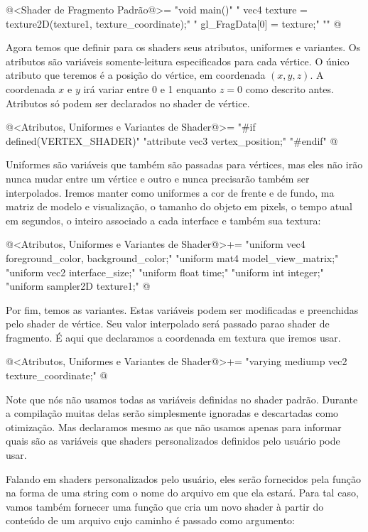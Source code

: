 \iniciocodigo
@<Shader de Fragmento Padrão@>=
"void main(){\n"
"  vec4 texture = texture2D(texture1, texture_coordinate);\n"
"  gl_FragData[0] = texture;\n"
"}\n"
@
\fimcodigo

Agora temos que definir para os shaders seus atributos, uniformes e
variantes. Os atributos são variáveis somente-leitura especificados
para cada vértice. O único atributo que teremos é a posição do
vértice, em coordenada $(x, y, z)$. A coordenada $x$ e $y$ irá variar
entre 0 e 1 enquanto $z=0$ como descrito antes. Atributos só podem ser
declarados no shader de vértice.

\iniciocodigo
@<Atributos, Uniformes e Variantes de Shader@>=
"#if defined(VERTEX_SHADER)\n"
"attribute vec3 vertex_position;\n"
"#endif\n"
@
\fimcodigo

Uniformes são variáveis que também são passadas para vértices, mas
eles não irão nunca mudar entre um vértice e outro e nunca precisarão
também ser interpolados. Iremos manter como uniformes a cor de frente
e de fundo, ma matriz de modelo e visualização, o tamanho do objeto em
pixels, o tempo atual em segundos, o inteiro associado a cada
interface e também sua textura:

\iniciocodigo
@<Atributos, Uniformes e Variantes de Shader@>+=
"uniform vec4 foreground_color, background_color;\n"
"uniform mat4 model_view_matrix;\n"
"uniform vec2 interface_size;\n"
"uniform float time;\n"
"uniform int integer;\n"
"uniform sampler2D texture1;\n"
@
\fimcodigo

Por fim, temos as variantes. Estas variáveis podem ser modificadas e
preenchidas pelo shader de vértice. Seu valor interpolado será passado
parao shader de fragmento. É aqui que declaramos a coordenada em
textura que iremos usar.

\iniciocodigo
@<Atributos, Uniformes e Variantes de Shader@>+=
"varying mediump vec2 texture_coordinate;\n"
@
\fimcodigo

Note que nós não usamos todas as variáveis definidas no shader
padrão. Durante a compilação muitas delas serão simplesmente ignoradas
e descartadas como otimização. Mas declaramos mesmo as que não usamos
apenas para informar quais são as variáveis que shaders personalizados
definidos pelo usuário pode usar.

Falando em shaders personalizados pelo usuário, eles serão fornecidos
pela função  na forma de uma string com
o nome do arquivo em que ela estará. Para tal caso, vamos também
fornecer uma função que cria um novo shader à partir do conteúdo de um
arquivo cujo caminho é passado como argumento:

